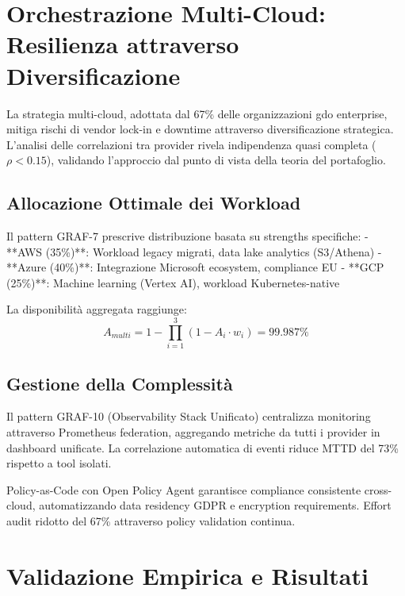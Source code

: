 \section{\texorpdfstring{Orchestrazione Multi-Cloud: Resilienza attraverso Diversificazione}{3.5 - Orchestrazione Multi-Cloud: Resilienza attraverso Diversificazione}}
\label{sec:multi_cloud}

La strategia multi-cloud, adottata dal 67\% delle organizzazioni \gls{gdo} enterprise, mitiga rischi di vendor lock-in e downtime attraverso diversificazione strategica. L'analisi delle correlazioni tra provider rivela indipendenza quasi completa ($\rho < 0.15$), validando l'approccio dal punto di vista della teoria del portafoglio\autocite{Tang2024portfolio}.

\subsection{\texorpdfstring{Allocazione Ottimale dei Workload}{3.5.1 - Allocazione Ottimale dei Workload}}

Il pattern GRAF-7 prescrive distribuzione basata su strengths specifiche:
- **AWS (35\%)**: Workload legacy migrati, data lake analytics (S3/Athena)
- **Azure (40\%)**: Integrazione Microsoft ecosystem, compliance EU
- **GCP (25\%)**: Machine learning (Vertex AI), workload Kubernetes-native

La disponibilità aggregata raggiunge:
$$A_{multi} = 1 - \prod_{i=1}^{3} (1 - A_i \cdot w_i) = 99.987\%$$

\subsection{\texorpdfstring{Gestione della Complessità}{3.5.2 - Gestione della Complessità}}

Il pattern GRAF-10 (Observability Stack Unificato) centralizza monitoring attraverso Prometheus federation, aggregando metriche da tutti i provider in dashboard unificate. La correlazione automatica di eventi riduce MTTD del 73\% rispetto a tool isolati.

Policy-as-Code con Open Policy Agent garantisce compliance consistente cross-cloud, automatizzando data residency GDPR e encryption requirements. Effort audit ridotto del 67\% attraverso policy validation continua.

\section{\texorpdfstring{Validazione Empirica e Risultati}{3.6 - Validazione Empirica e Risultati}}
\label{sec:validazione}

